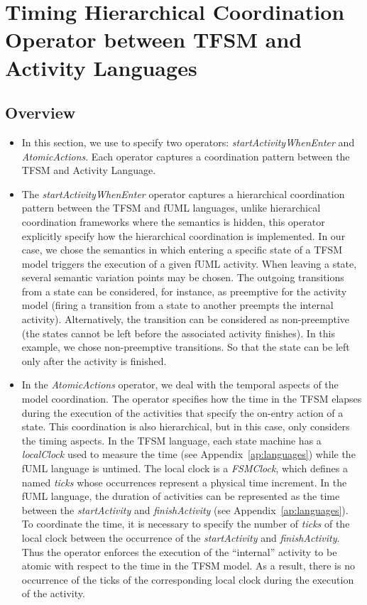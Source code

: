 \section{Timing Hierarchical Coordination Operator between TFSM and Activity Languages}
\subsection{Overview}
	\begin{itemize}
		\item In this section, we use \bcool to specify two operators: \emph{startActivityWhenEnter} and \emph{AtomicActions}. Each operator captures a coordination pattern between the TFSM and Activity Language. 
		
		\item The \emph{startActivityWhenEnter} operator captures a hierarchical coordination pattern between the TFSM and fUML languages, unlike hierarchical coordination frameworks where the semantics is hidden, this operator explicitly specify how the hierarchical coordination is implemented. In our case, we chose the semantics in which entering a specific state of a TFSM model triggers the execution of a given fUML activity. When leaving a state, several semantic variation points may be chosen. The outgoing transitions from a state can be considered, for instance, as preemptive for the activity model (\ie firing a transition from a state to another preempts the internal activity). Alternatively, the transition can be considered as non-preemptive (\ie the states cannot be left before the associated activity finishes). In this example, we chose non-preemptive transitions. So that the state can be left only after the activity is finished. 
		
		\item In the \emph{AtomicActions} operator, we deal with the temporal aspects of the model coordination. The operator specifies how the time in the TFSM elapses during the execution of the activities that specify the on-entry action of a state. This coordination is also hierarchical, but in this case, only considers the timing aspects. In the TFSM language, each state machine has a \emph{localClock} used to measure the time (see Appendix~\ref{ap:languages}) while the fUML language is untimed. The local clock is a \emph{FSMClock}, which defines a \dse named \emph{ticks} whose occurrences represent a physical time increment. In the fUML language, the duration of activities can be represented as the time between the \dse \emph{startActivity} and \dse \emph{finishActivity} (see Appendix~\ref{ap:languages}). To coordinate the time, it is necessary to specify the number of \emph{ticks} of the local clock between the occurrence of the \dse \emph{startActivity} and \emph{finishActivity}. Thus the operator enforces the execution of the ``internal'' activity to be atomic with respect to the time in the TFSM model. As a result, there is no occurrence of the \dse ticks of the corresponding local clock during the execution of the activity.


\end{itemize}
